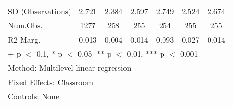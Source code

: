 \documentclass[
  letterpaper,
  DIV=11,
  numbers=noendperiod]{scrreprt}
\begin{document}
\begin{table}
\begin{tabular}[t]{lcccccc}
\hspace{1em}SD (Observations) & 2.721 & 2.384 & 2.597 & 2.749 & 2.524 & 2.674\\
\hspace{1em}Num.Obs. & 1277 & 258 & 255 & 254 & 255 & 255\\
\hspace{1em}R2 Marg. & 0.013 & 0.004 & 0.014 & 0.093 & 0.027 & 0.014\\
\bottomrule
\multicolumn{7}{l}{\rule{0pt}{1em}+ p $<$ 0.1, * p $<$ 0.05, ** p $<$ 0.01, *** p $<$ 0.001}\\
\multicolumn{7}{l}{\rule{0pt}{1em}Method: Multilevel linear regression}\\
\multicolumn{7}{l}{\rule{0pt}{1em}Fixed Effects: Classroom}\\
\multicolumn{7}{l}{\rule{0pt}{1em}Controls: None}\\
\end{tabular}
\end{table}
\end{document}
